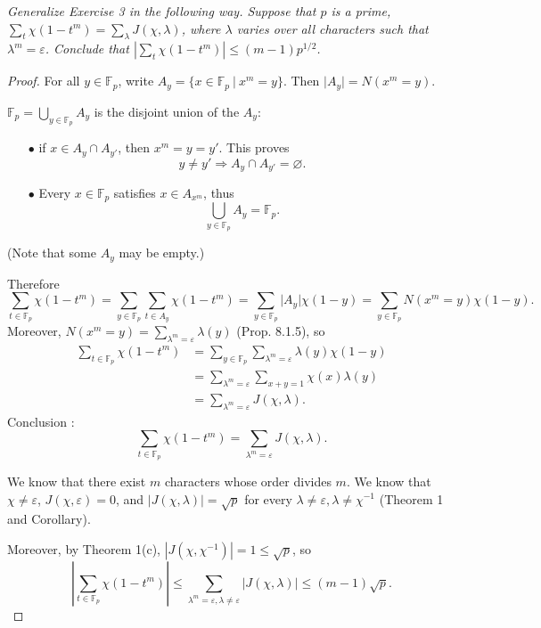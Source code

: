 \documentclass[11pt,a4paper]{article}
\newcommand{\F}{\mathbb{F}}
\begin{document}
{{\it Generalize Exercise 3 in the following way. Suppose that $p$ is a prime, $\sum_t \chi(1-t^m) = \sum_{\lambda} J(\chi,\lambda)$, where $\lambda$ varies over all characters such that $\lambda^m = \varepsilon$. Conclude that $\left | \sum_t \chi(1-t^m) \right | \leq (m-1)p^{1/2}$.

}

\begin{proof}
For all $y \in \F_p$, write  $A_y =\{x \in \mathbb{F}_p\ \vert \ x^m = y\}$. Then $\vert A_y\vert = N(x^m = y)$.

$\mathbb{F}_p = \bigcup_{y \in \mathbb{F}_p} A_y$ is the disjoint union of the $A_y$:

\begin{enumerate}
\item[$\bullet$] if $x \in A_y \cap A_{y'}$, then $x^m = y = y'$. This proves
$$y \ne y' \Rightarrow A_y \cap A_{y'} = \varnothing.$$
\item[$\bullet$] Every $x \in \F_p$ satisfies $x \in A_{x^m}$, thus
$$\bigcup_{y \in \F_p} A_y = \F_p.$$
\end{enumerate}
(Note that some $A_y$ may be empty.)

Therefore
$$\sum_{t\in \mathbb{F}_p} \chi(1-t^m) = \sum_{y\in \mathbb{F}_p} \sum\limits_{t \in A_y} \chi(1-t^m) = \sum_{y\in \mathbb{F}_p} \vert A_y \vert \chi(1-y) =\sum_{y\in \mathbb{F}_p} N(x^m = y) \chi(1-y).$$
Moreover, $N(x^m=y) = \sum\limits_{\lambda^m = \varepsilon} \lambda(y)$ (Prop. 8.1.5), so
\begin{align*}
\sum_{t\in \mathbb{F}_p} \chi(1-t^m) &= \sum_{y\in \mathbb{F}_p}  \sum_{\lambda^m = \varepsilon} \lambda(y)  \chi(1-y)\\
& =  \sum\limits_{\lambda^m = \varepsilon}  \sum\limits_{x+y=1} \chi(x) \lambda(y)\\
& = \sum\limits_{\lambda^m = \varepsilon} J(\chi,\lambda).
\end{align*}
Conclusion : $$\sum\limits_{t\in \mathbb{F}_p} \chi(1-t^m) = \sum\limits_{\lambda^m = \varepsilon} J(\chi,\lambda).$$

We know that there exist $m$ characters whose order divides $m$. We know that $\chi \ne \varepsilon$, $J(\chi,\varepsilon)=0$, and  $\vert J(\chi,\lambda) \vert = \sqrt{p}$ for every $\lambda \ne \varepsilon,\lambda\ne \chi^{-1}$ (Theorem 1 and Corollary).

Moreover, by Theorem 1(c), $|J(\chi,\chi^{-1})|  = 1 \leq \sqrt{p}$, so
$$\left \vert \sum_{t\in \mathbb{F}_p} \chi(1-t^m)\right  \vert \leq \sum_{\lambda^m = \varepsilon, \lambda \neq \varepsilon} \vert J(\chi,\lambda) \vert \leq  (m-1)\sqrt{p}.$$
\end{proof}

}
\end{document}
